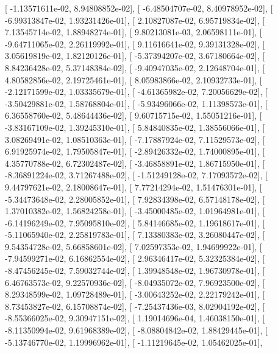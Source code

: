 \documentclass{article}
\begin{document}
       [ -1.13571611e-02,   8.94808852e-02],
       [ -6.48504707e-02,   8.40978952e-02],
       [ -6.99313847e-02,   1.93231426e-01],
       [  2.10827087e-02,   6.95719834e-02],
       [  7.13545714e-02,   1.88948274e-01],
       [  9.80213081e-03,   2.06598111e-01],
       [ -9.64711065e-02,   2.26119992e-01],
       [  9.11616641e-02,   9.39131328e-02],
       [  3.05619819e-02,   1.82120126e-01],
       [ -5.37394207e-02,   3.67180664e-02],
       [  8.84236428e-02,   5.37148384e-02],
       [ -9.40947035e-02,   2.12648704e-01],
       [  4.80582856e-02,   2.19725461e-01],
       [  8.05983866e-02,   2.10932733e-01],
       [ -2.12171599e-02,   1.03335679e-01],
       [ -4.61365982e-02,   7.20056629e-02],
       [ -3.50429881e-02,   1.58768804e-01],
       [ -5.93496066e-02,   1.11398573e-01],
       [  6.36558760e-02,   5.48644436e-02],
       [  9.60715715e-02,   1.55051216e-01],
       [ -3.83167109e-02,   1.39245310e-01],
       [  5.84840835e-02,   1.38556066e-01],
       [  3.08269491e-02,   1.08510363e-01],
       [ -7.17887924e-02,   7.11529573e-02],
       [  6.91925974e-02,   1.79505847e-01],
       [ -2.89426332e-02,   1.74000895e-01],
       [  4.35770788e-02,   6.72302487e-02],
       [ -3.46858891e-02,   1.86715950e-01],
       [ -8.36891224e-02,   3.71267488e-02],
       [ -1.51249128e-02,   7.17093572e-02],
       [  9.44797621e-02,   2.18008647e-01],
       [  7.77214294e-02,   1.51476301e-01],
       [ -5.34473648e-02,   2.28005852e-01],
       [  7.92834398e-02,   6.57148178e-02],
       [  1.37010382e-02,   1.56824258e-01],
       [ -3.45000485e-02,   1.01964981e-01],
       [ -6.14196249e-02,   7.95095810e-02],
       [  5.84146685e-02,   1.19618617e-01],
       [ -5.11065940e-02,   2.25819783e-01],
       [  7.13380383e-02,   3.26080447e-02],
       [  9.54354728e-02,   5.66858601e-02],
       [  7.02597353e-02,   1.94699922e-01],
       [ -7.94599271e-02,   6.16862554e-02],
       [  2.96346417e-02,   5.32325384e-02],
       [ -8.47456245e-02,   7.59032744e-02],
       [  1.39948548e-02,   1.96730978e-01],
       [  6.46763573e-02,   9.22570936e-02],
       [ -8.04935072e-02,   7.96923500e-02],
       [  8.29348599e-02,   1.09728489e-01],
       [ -3.00643252e-02,   2.22179242e-01],
       [  8.73453827e-02,   6.15708874e-02],
       [ -7.25437436e-03,   8.02904192e-02],
       [ -8.55366025e-02,   9.30947151e-02],
       [  1.19014696e-04,   1.46038150e-01],
       [ -8.11350994e-02,   9.61968389e-02],
       [ -8.08804842e-02,   1.88429445e-01],
       [ -5.13746770e-02,   1.19996962e-01],
       [ -1.11219645e-02,   1.05462025e-01],
\end{document}
